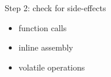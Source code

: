\documentclass{beamer}
\begin{document}


\begin{frame}[fragile]{Step 2: check for side-effects}
  \begin{itemize}
  \item function calls
  \item inline assembly
  \item volatile operations
  \end{itemize}
\end{frame}
\end{document}
